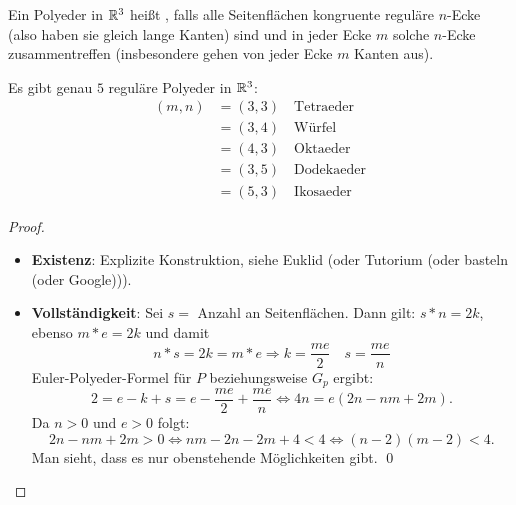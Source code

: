 \begin{definition}
  Ein Polyeder in \( \mathbb{R}^3 \) heißt \label{def:regulaererPolyeder}, falls alle Seitenflächen kongruente reguläre \( n \)-Ecke (also haben sie gleich lange Kanten) sind und in jeder Ecke \( m \) solche \( n \)-Ecke zusammentreffen (insbesondere gehen von jeder Ecke \( m \) Kanten aus).
\end{definition}

\begin{theorem}
  Es gibt genau \( 5 \) reguläre Polyeder in \( \mathbb{R}^3 \):
  \begin{align*}
    (m,n) &= (3,3) \quad \text{Tetraeder}  \\
     &= (3,4) \quad \text{Würfel} \\
     &= (4,3) \quad \text{Oktaeder} \\
     &= (3,5) \quad \text{Dodekaeder} \\
     &= (5,3) \quad \text{Ikosaeder}
  \end{align*}
  \begin{proof}
    \
    \begin{itemize}
      \item \textbf{Existenz}: Explizite Konstruktion, siehe Euklid (oder Tutorium (oder basteln (oder Google))).
      \item \textbf{Vollständigkeit}: Sei \( s = \) Anzahl an Seitenflächen. Dann gilt: \( s*n = 2k \), ebenso \( m*e = 2k \) und damit
        \begin{equation*}
          n*s = 2k = m*e \Rightarrow k = \frac{me}{2} \quad s = \frac{me}{n}
        \end{equation*}
        Euler-Polyeder-Formel für \( P \) beziehungsweise \( G_p \) ergibt:
        \begin{equation*}
          2 = e-k+s = e - \frac{me}{2} + \frac{me}{n} \Leftrightarrow 4n = e\left( 2n - nm + 2m \right)\text{.}
        \end{equation*}
        Da \( n > 0 \) und \( e > 0 \) folgt:
        \begin{equation*}
          2n - nm + 2m > 0 \Leftrightarrow nm - 2n - 2m + 4 < 4 \Leftrightarrow (n-2)(m-2) < 4\text{.}
        \end{equation*}
        Man sieht, dass es nur obenstehende Möglichkeiten gibt. \qed{}
    \end{itemize}
  \end{proof}
\end{theorem}

